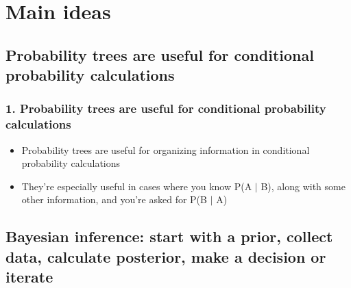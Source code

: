 \documentclass[slidestop,compress,mathserif,12pt,t,professionalfonts,xcolor=table]{beamer}
\begin{document}

\section{Main ideas}


\subsection{Probability trees are useful for conditional probability calculations}
\label{mi1}


\begin{frame}
\frametitle{1. Probability trees are useful for conditional probability calculations}

\begin{itemize}

\item Probability trees are useful for organizing information in conditional probability calculations

\item They're especially useful in cases where you know P(A $|$ B), along with some other information, and you're asked for P(B $|$ A)

\end{itemize}


\end{frame}


\subsection{Bayesian inference: start with a prior, collect data, calculate posterior, make a decision or iterate}
\label{mi2}

\end{document}

